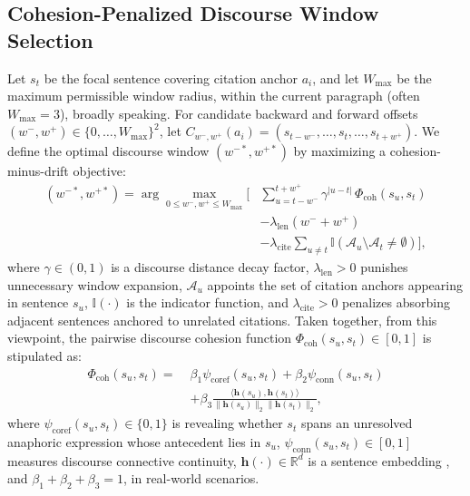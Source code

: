 \documentclass[sigconf]{acmart}
\begin{document}
\subsection{Cohesion-Penalized Discourse Window Selection}
Let $s_t$ be the focal sentence covering citation anchor $a_i$, and let $W_{\max}$ be the maximum permissible window radius, within the current paragraph (often $W_{\max}=3$), broadly speaking. For candidate backward and forward offsets $(w^-, w^+) \in \{0, \dots, W_{\max}\}^2$, let $C_{w^-, w^+}(a_i) = (s_{t-w^-}, \dots, s_t, \dots, s_{t+w^+})$. We define the optimal discourse window $(w^{-*}, w^{+*})$ by maximizing a cohesion-minus-drift objective:
\begin{equation}
\begin{aligned}
(w^{-*}, w^{+*}) = \arg\max_{0 \leq w^-, w^+ \leq W_{\max}} \Bigg[ & \sum_{u=t-w^-}^{t+w^+} \gamma^{|u-t|} \, \Phi_{\text{coh}}(s_u, s_t) \\
& - \lambda_{\text{len}} (w^- + w^+) \\
& - \lambda_{\text{cite}} \sum_{u \neq t} \mathbb{I}(\mathcal{A}_u \setminus \mathcal{A}_t \neq \emptyset) \Bigg],
\end{aligned}
\label{eq:window_opt}
\end{equation}
where $\gamma \in (0, 1)$ is a discourse distance decay factor, $\lambda_{\text{len}} > 0$ punishes unnecessary window expansion, $\mathcal{A}_u$ appoints the set of citation anchors appearing in sentence $s_u$, $\mathbb{I}(\cdot)$ is the indicator function, and $\lambda_{\text{cite}} > 0$ penalizes absorbing adjacent sentences anchored to unrelated citations. Taken together, from this viewpoint, the pairwise discourse cohesion function $\Phi_{\text{coh}}(s_u, s_t) \in [0, 1]$ is stipulated as:
\begin{equation}
\begin{aligned}
\Phi_{\text{coh}}(s_u, s_t) = \;& \beta_1 \psi_{\text{coref}}(s_u, s_t) + \beta_2 \psi_{\text{conn}}(s_u, s_t) \\
& + \beta_3 \frac{\langle \mathbf{h}(s_u), \mathbf{h}(s_t) \rangle}{\|\mathbf{h}(s_u)\|_2 \|\mathbf{h}(s_t)\|_2},
\end{aligned}
\label{eq:cohesion_score}
\end{equation}
where $\psi_{\text{coref}}(s_u, s_t) \in \{0, 1\}$ is revealing whether $s_t$ spans an unresolved anaphoric expression whose antecedent lies in $s_u$, $\psi_{\text{conn}}(s_u, s_t) \in [0, 1]$ measures discourse connective continuity, $\mathbf{h}(\cdot) \in \mathbb{R}^d$ is a sentence embedding \cite{beltagy2019scibert,reimers2019sentence}, and $\beta_1 + \beta_2 + \beta_3 = 1$, in real-world scenarios.
\end{document}
